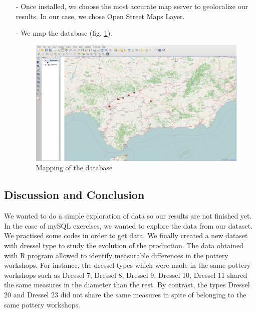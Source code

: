 \documentclass[10pt,a4paper]{article}
\begin{document}
\begin{itemize}
\item[-] Once installed, we choose the most accurate map server to geolocalize our results. In our case, we chose Open Street Maps Layer. 


\newpage

\item[-] We map the database (fig. \ref{gismap}).

\begin{figure}[htp]
  \centering
\includegraphics[scale=0.15]{gismap.png}
\caption{Mapping of the database}
\label{gismap}
\end{figure}

\end{itemize}

\subsection{Discussion and Conclusion}


We wanted to do a simple exploration of data so our results are not finished yet. In the case of mySQL exercises, we wanted to explore the data from our dataset. \\

We practised some codes in order to get data. We finally created a new dataset with dressel type to study the evolution of the production. The data obtained with R program allowed to identify measurable differences in the pottery workshops. For instance, the dressel types which were made in the same pottery workshops such as Dressel 7, Dressel 8, Dressel 9, Dressel 10, Dressel 11 shared the same measures in the diameter than the rest. By contrast, the types Dressel 20 and Dressel 23 did not share the same measures in spite of belonging to the same pottery workshops. \\
\end{document}
